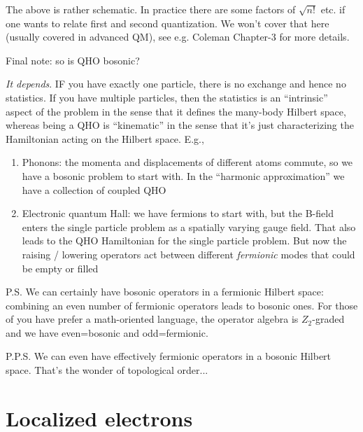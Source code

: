 The above is rather schematic. In practice there are some factors of $\sqrt{n!}$ etc. if one wants to relate first and second quantization. We won't cover that here (usually covered in advanced QM), see e.g. Coleman Chapter-3 for more details.

Final note: so is QHO bosonic?

\emph{It depends}. IF you have exactly one particle, there is no exchange and hence no statistics. If you have multiple particles, then the statistics is an ``intrinsic'' aspect of the problem in the sense that it defines the many-body Hilbert space, whereas being a QHO is ``kinematic'' in the sense that it's just characterizing the Hamiltonian acting on the Hilbert space. E.g.,
\begin{enumerate}
    \item Phonons: the momenta and displacements of different atoms commute, so we have a bosonic problem to start with. In the ``harmonic approximation'' we have a collection of coupled QHO
    \item Electronic quantum Hall: we have fermions to start with, but the B-field enters the single particle problem as a spatially varying gauge field. That also leads to the QHO Hamiltonian for the single particle problem. But now the raising / lowering operators act between different \emph{fermionic} modes that could be empty or filled
\end{enumerate}

P.S. We can certainly have bosonic operators in a fermionic Hilbert space: combining an even number of fermionic operators leads to bosonic ones. For those of you have prefer a math-oriented language, the operator algebra is $Z_2$-graded and we have even=bosonic and odd=fermionic.

P.P.S. We can even have effectively fermionic operators in a bosonic Hilbert space. That's the wonder of topological order...

\section{Localized electrons}

